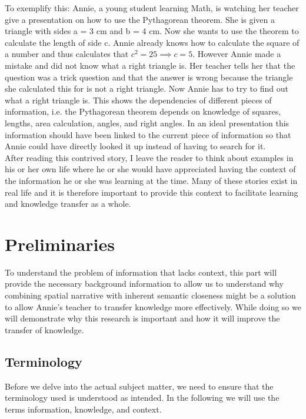 \documentclass[twoside]{article}
\begin{document}
To exemplify this: Annie, a young student learning Math, is watching her teacher give a presentation on how to use the Pythagorean theorem. She is given a triangle with sides a = 3 cm and b = 4 cm. Now she wants to use the theorem to calculate the length of side c. Annie already knows how to calculate the square of a number and thus calculates that $c^2 = 25 \implies c = 5$. However Annie made a mistake and did not know what a right triangle is. Her teacher tells her that the question was a trick question and that the answer is wrong because the triangle she calculated this for is not a right triangle. Now Annie has to try to find out what a right triangle is. This shows the dependencies of different pieces of information, i.e. the Pythagorean theorem depends on knowledge of squares, lengths, area calculation, angles, and right angles. In an ideal presentation this information should have been linked to the current piece of information so that Annie could have directly looked it up instead of having to search for it.\\

After reading this contrived story, I leave the reader to think about examples in his or her own life where he or she would have appreciated having the context of the information he or she was learning at the time. Many of these stories exist in real life and it is therefore important to provide this context to facilitate learning and knowledge transfer as a whole. \\

\newpage
\section{Preliminaries}
To understand the problem of information that lacks context, this part will provide the necessary background information to allow us to understand why combining spatial narrative with inherent semantic closeness might be a solution to allow Annie's teacher to transfer knowledge more effectively. While doing so we will demonstrate why this research is important and how it will improve the transfer of knowledge.\\

\subsection{Terminology}
Before we delve into the actual subject matter, we need to ensure that the terminology used is understood as intended. In the following we will use the terms information, knowledge, and context.\\
\end{document}
